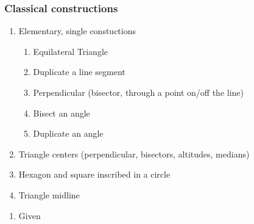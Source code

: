 \documentclass[12pt, oneside]{article}
\begin{document}
\subsubsection*{Classical constructions}
\begin{enumerate}
  \item Elementary, single constuctions
  \begin{enumerate}
    \item Equilateral Triangle
    \item Duplicate a line segment
    \item Perpendicular (bisector, through a point on/off the line)
    \item Bisect an angle
    \item Duplicate an angle
    \end{enumerate}
  \item Triangle centers (perpendicular, bisectors, altitudes, medians)
  \item Hexagon and square inscribed in a circle
  \item Triangle midline
  \end{enumerate}

\begin{enumerate}
\subsubsection*{Equilateral triangle}
  \item Given


  \end{enumerate}
\end{document}
